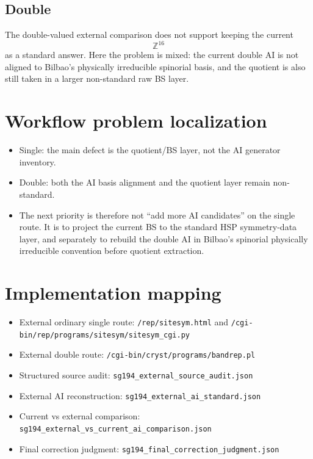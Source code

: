 \documentclass[11pt]{article}
\begin{document}
\subsection{Double}
The double-valued external comparison does not support keeping the current
\[
\mathbb{Z}^{16}
\]
as a standard answer. Here the problem is mixed: the current double AI is not aligned to Bilbao's physically irreducible spinorial basis, and the quotient is also still taken in a larger non-standard raw BS layer.

\section{Workflow problem localization}
\begin{itemize}
\item Single: the main defect is the quotient/BS layer, not the AI generator inventory.
\item Double: both the AI basis alignment and the quotient layer remain non-standard.
\item The next priority is therefore not ``add more AI candidates'' on the single route. It is to project the current BS to the standard HSP symmetry-data layer, and separately to rebuild the double AI in Bilbao's spinorial physically irreducible convention before quotient extraction.
\end{itemize}

\section{Implementation mapping}
\begin{itemize}
\item External ordinary single route: \texttt{/rep/sitesym.html} and \texttt{/cgi-bin/rep/programs/sitesym/sitesym\_cgi.py}
\item External double route: \texttt{/cgi-bin/cryst/programs/bandrep.pl}
\item Structured source audit: \texttt{sg194\_external\_source\_audit.json}
\item External AI reconstruction: \texttt{sg194\_external\_ai\_standard.json}
\item Current vs external comparison: \texttt{sg194\_external\_vs\_current\_ai\_comparison.json}
\item Final correction judgment: \texttt{sg194\_final\_correction\_judgment.json}
\end{itemize}
\end{document}
